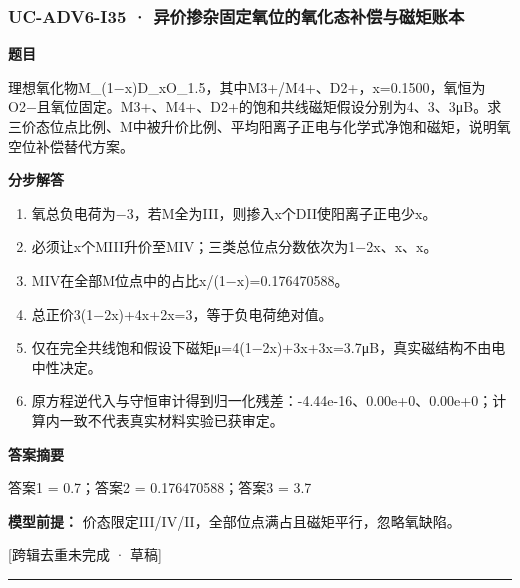\documentclass[UTF8,11pt,a4paper]{ctexart}
\begin{document}
\subsubsection*{UC-ADV6-I35 · 异价掺杂固定氧位的氧化态补偿与磁矩账本}
\noindent\textbf{题目}\par
理想氧化物M\_(1−x)D\_xO\_1.5，其中M3+/M4+、D2+，x=0.1500，氧恒为O2−且氧位固定。M3+、M4+、D2+的饱和共线磁矩假设分别为4、3、3μB。求三价态位点比例、M中被升价比例、平均阳离子正电与化学式净饱和磁矩，说明氧空位补偿替代方案。\par
\medskip\noindent\textbf{分步解答}
\begin{enumerate}
\item 氧总负电荷为−3，若M全为III，则掺入x个DII使阳离子正电少x。
\item 必须让x个MIII升价至MIV；三类总位点分数依次为1−2x、x、x。
\item MIV在全部M位点中的占比x/(1−x)=0.176470588。
\item 总正价3(1−2x)+4x+2x=3，等于负电荷绝对值。
\item 仅在完全共线饱和假设下磁矩μ=4(1−2x)+3x+3x=3.7μB，真实磁结构不由电中性决定。
\item 原方程逆代入与守恒审计得到归一化残差：-4.44e-16、0.00e+0、0.00e+0；计算内一致不代表真实材料实验已获审定。
\end{enumerate}
\noindent\textbf{答案摘要}\par
答案1 = 0.7；答案2 = 0.176470588；答案3 = 3.7\par
\noindent\textbf{模型前提：}
价态限定III/IV/II，全部位点满占且磁矩平行，忽略氧缺陷。\par
\noindent\textcolor{red!65!black}{[跨辑去重未完成 · 草稿]} \par
\medskip\hrule\medskip
{}
\end{document}
